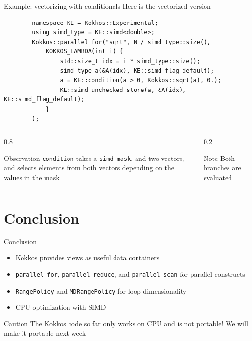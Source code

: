 \documentclass[
    aspectratio=169,
]{beamer}
\begin{document}
\begin{frame}[fragile]{Example: vectorizing with conditionals}
    Here is the vectorized version
    \begin{verbatim}
        namespace KE = Kokkos::Experimental;
        using simd_type = KE::simd<double>;
        Kokkos::parallel_for("sqrt", N / simd_type::size(),
            KOKKOS_LAMBDA(int i) {
                std::size_t idx = i * simd_type::size();
                simd_type a(&A(idx), KE::simd_flag_default);
                a = KE::condition(a > 0, Kokkos::sqrt(a), 0.);
                KE::simd_unchecked_store(a, &A(idx), KE::simd_flag_default);
            }
        );
    \end{verbatim}

    \vspace{-1em}
    \begin{columns}
        \begin{column}{0.8\linewidth}
            \begin{block}{Observation}
                \texttt{condition} takes a \texttt{simd\_mask}, and two vectors, and selects elements from both vectors depending on the values in the mask
            \end{block}
        \end{column}
        \begin{column}{0.2\linewidth}
            \begin{block}{Note}
                Both branches are evaluated
            \end{block}
        \end{column}
    \end{columns}
\end{frame}

\section{Conclusion}

\begin{frame}{Conclusion}
    \begin{itemize}
        \item Kokkos provides views as useful data containers
        \item \texttt{parallel\_for}, \texttt{parallel\_reduce}, and \texttt{parallel\_scan} for parallel constructs
        \item \texttt{RangePolicy} and \texttt{MDRangePolicy} for loop dimensionality
        \item CPU optimization with SIMD
    \end{itemize}
    \pause
    \vspace{2em}
    \begin{alertblock}{Caution}
        The Kokkos code so far only works on CPU and is not portable! We will make it portable next week
    \end{alertblock}
\end{frame}

\begin{frame}[plain]
    \closingpage
\end{frame}
\end{document}
